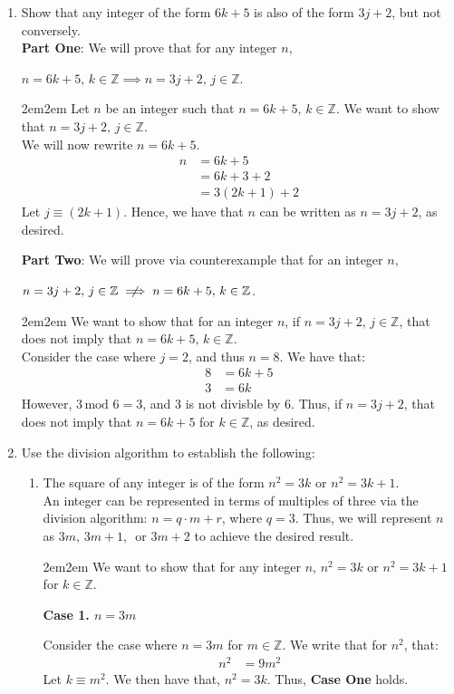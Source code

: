 \documentclass[10pt,oneside]{book}
\newcommand{\Z}{\mathbb{Z}}\newcommand{\R}{\mathbb{R}}\newcommand{\N}{\mathbb{N}}
\newcommand{\n}{\vspace{0.15cm}\\}
\newcommand{\en}{\vspace{0.25cm}\\}
\newcommand{\centerit}[1]{{\begin{center} #1 \end{center}}}
\let\endoldproof\endproof
\renewenvironment{proof}[1][\proofname]
  {\vspace{0.2cm}\begin{adjustwidth}{2em}{2em}
   \oldproof[#1]}
  {\endoldproof
   \end{adjustwidth}}
\begin{document}
\begin{enumerate}
	\item Show that any integer of the form $6k+5$ is also of the form $3j + 2$, but not conversely. \en
	\textbf{Part One}: We will prove that for any integer $n$, \centerit{$n=6k+5, \,k\in \Z \implies n=3j+2,\,j\in\Z$.}
	\begin{proof}
		Let $n$ be an integer such that $n = 6k+5, \,k\in\Z$. We want to show that $n = 3j+2, \,j\in\Z$. \n
		We will now rewrite $n=6k+5$.
		\begin{align*}
			n &= 6k+5\\
			&=6k + 3 + 2\\
			&= 3(2k + 1) + 2
		\end{align*}
		Let $j\equiv (2k+1)$. Hence, we have that $n$ can be written as $n = 3j + 2$, as desired. 
	\end{proof}
	\textbf{Part Two}: We will prove via counterexample that for an integer $n$, \centerit{$n=3j+2, \,j\in \Z \centernot\implies n=6k+5,\,k\in\Z$.}
	\begin{proof}
		We want to show that for an integer $n$, if $n=3j+2,\,j\in\Z$, that does not imply that $n = 6k+5,\,k\in\Z$. \n
		Consider the case where $j = 2$, and thus $n = 8$. We have that:
		\begin{align*}
			8 &= 6k+5\\
			3 &= 6k
		\end{align*}
		However, $3\,\text{mod } 6 = 3$, and 3 is not divisble by 6. Thus, if $n = 3j+2$, that does not imply that $n = 6k+5$ for $k\in\Z$, as desired.
	\end{proof}
	\item Use the division algorithm to establish the following:
	\begin{enumerate}
		\item [(a)] The square of any integer is of the form $n^2 = 3k$ or $n^2 = 3k+1$. \en
		An integer can be represented in terms of multiples of three via the division algorithm: $n = q\cdot m + r$, where $q = 3$. Thus, we will represent $n$ as $3m,\, 3m+1,\, $ or $3m+2$ to achieve the desired result. 
		\begin{proof}
			We want to show that for any integer $n$, $n^2 = 3k$ or $n^2 = 3k+1$ for $k\in \Z$.
			\centerit{\textbf{Case 1. $n = 3m$}}
			Consider the case where $n = 3m$ for $m\in\Z$. We write that for $n^2$, that:
			\begin{align*}
				n^2 &= 9m^2
			\end{align*}
			Let $k \equiv m^2$. We then have that, $n^2 = 3k$. Thus, \textbf{Case One} holds.

\end{proof}
\end{enumerate}
\end{enumerate}
\end{document}
